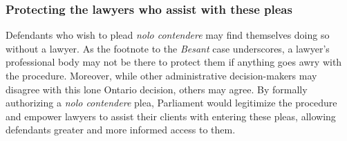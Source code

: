\subsubsection{Protecting the lawyers who assist with these pleas}

Defendants who wish to plead \textit{nolo contendere} may find themselves doing so without a lawyer. As the footnote to the \textit{Besant} case underscores, a lawyer's professional body may not be there to protect them if anything goes awry with the procedure. Moreover, while other administrative decision-makers may disagree with this lone Ontario decision, others may agree. By formally authorizing a \textit{nolo contendere} plea, Parliament would legitimize the procedure and empower lawyers to assist their clients with entering these pleas, allowing defendants greater and more informed access to them.